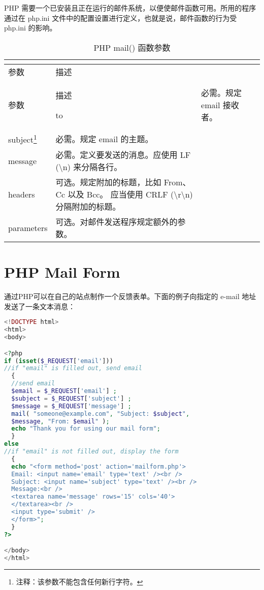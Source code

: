 PHP 需要一个已安装且正在运行的邮件系统，以便使邮件函数可用。所用的程序通过在 php.ini 文件中的配置设置进行定义，也就是说，邮件函数的行为受 php.ini 的影响。





\begin{longtable}{|m{100pt}|m{280pt}|}
\tabularnewline\hline
参数	&描述
\endhead

\caption{PHP mail() 函数参数}\\
\hline
参数	&描述
\endfirsthead

\endfoot

\endlastfoot
\hline
to			&必需。规定 email 接收者。\\
\hline
subject\footnote{注释：该参数不能包含任何新行字符。}		&必需。规定 email 的主题。\\
\hline
message	&必需。定义要发送的消息。应使用 LF ({\textbackslash}n) 来分隔各行。\\
\hline
headers		&可选。规定附加的标题，比如 From、Cc 以及 Bcc。
			\newline 应当使用 CRLF ({\textbackslash}r{\textbackslash}n) 分隔附加的标题。\\
\hline
parameters	&可选。对邮件发送程序规定额外的参数。\\
\hline
\end{longtable}
















\section{PHP Mail Form}


通过PHP可以在自己的站点制作一个反馈表单。下面的例子向指定的 e-mail 地址发送了一条文本消息：

\begin{lstlisting}[language=PHP]
<!DOCTYPE html>
<html>
<body>

<?php
if (isset($_REQUEST['email']))
//if "email" is filled out, send email
  {
  //send email
  $email = $_REQUEST['email'] ; 
  $subject = $_REQUEST['subject'] ;
  $message = $_REQUEST['message'] ;
  mail( "someone@example.com", "Subject: $subject",
  $message, "From: $email" );
  echo "Thank you for using our mail form";
  }
else
//if "email" is not filled out, display the form
  {
  echo "<form method='post' action='mailform.php'>
  Email: <input name='email' type='text' /><br />
  Subject: <input name='subject' type='text' /><br />
  Message:<br />
  <textarea name='message' rows='15' cols='40'>
  </textarea><br />
  <input type='submit' />
  </form>";
  }
?>

</body>
</html>
\end{lstlisting}


